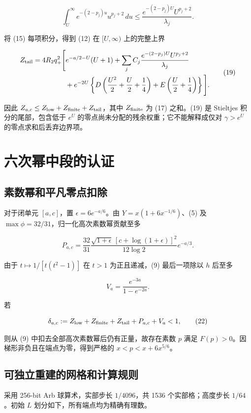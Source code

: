 \documentclass[UTF8,zihao=-4,fontset=fandol]{ctexart}
\begin{document}
\[
\int_U^\infty e^{-(2-p_j)u}u^{p_j+2}\,du
\le\frac{e^{-(2-p_j)U}U^{p_j+2}}{\lambda_j}. \tag{18}
\]

将 (15) 每项积分，得到 (12) 在 \([U,\infty)\) 上的完整上界

\[
\begin{aligned}
Z_{\rm tail}=4R_2q_+^2\Bigg[&e^{-a/2-U}(U+1)
+\sum_j C_j\frac{e^{-(2-p_j)U}U^{p_j+2}}{\lambda_j}\\
&+e^{-2U}\left\{
D\left(\frac{U^2}{2}+\frac U2+\frac14\right)
+E\left(\frac U2+\frac14\right)\right\}\Bigg].
\end{aligned} \tag{19}
\]

因此 \(Z_{a,c}\le Z_{\rm low}+Z_{\rm finite}+Z_{\rm tail}\)，其中 \(Z_{\rm finite}\) 为 (17) 之和。(19) 是 Stieltjes 积分的尾部，包含低于 \(e^U\) 的零点尚未分配的残余权重；它不能解释成仅对 \(\gamma>e^U\) 的零点求和后丢弃边界项。

\section{六次幂中段的认证}

\subsection{素数幂和平凡零点扣除}

对于闭单元 \([a,c]\)，置 \(\epsilon=6e^{-a/6}\)。由 \(Y=x(1+6x^{-1/6})\)、(5) 及 \(\max\phi=32/31\)，归一化高次素数幂贡献至多

\[
P_{a,c}=\frac{32}{31}
\frac{\sqrt{1+\epsilon}\,[c+\log(1+\epsilon)]^2}{12\log2}
e^{-a/3}. \tag{20}
\]

由于 \(t\mapsto1/[t(t^2-1)]\) 在 \(t>1\) 为正且递减，(9) 最后一项除以 \(h\) 后至多

\[
V_a=\frac{e^{-3a}}{1-e^{-2a}}. \tag{21}
\]

若

\[
\delta_{a,c}:=Z_{\rm low}+Z_{\rm finite}+Z_{\rm tail}+P_{a,c}+V_a<1, \tag{22}
\]

则从 (9) 中扣去全部高次素数幂后仍有正量，故存在素数 \(p\) 满足 \(F(p)>0\)。因梯形非负且在端点为零，得到严格的 \(x<p<x+6x^{5/6}\)。

\subsection{可独立重建的网格和计算规则}

采用 256-bit Arb 球算术，实部步长 \(1/4096\)，共 1536 个实部格；高度步长 \(1/64\)。初始 \(L\) 划分如下，所有端点均为精确有理数。
\end{document}
